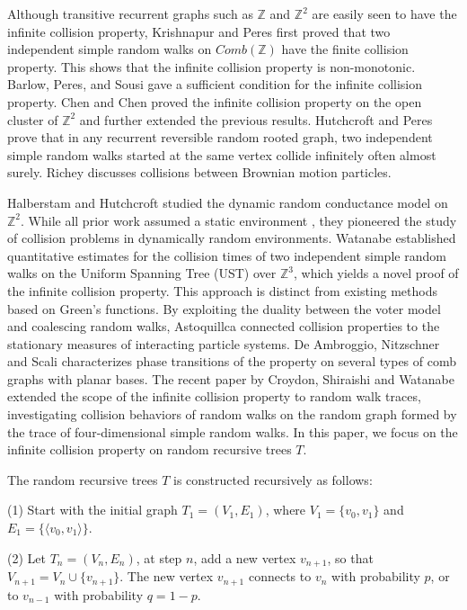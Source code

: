 \documentclass[10pt,twoside]{article}
\begin{document}
Although transitive recurrent graphs such as $\mathbb{Z}$ and $\mathbb{Z}^2$ are easily seen to have the infinite collision property, Krishnapur and Peres\cite{KP2004} first proved that two independent simple random walks on $Comb(\mathbb{Z})$ have the finite collision property. This shows that the infinite collision property is non-monotonic. Barlow, Peres, and Sousi\cite{BPS2010} gave a sufficient condition for the infinite collision property. Chen and Chen\cite{CC2010} proved the infinite collision property on the open cluster of $\mathbb{Z}^2$ and\cite{CC2011} further extended the previous results. Hutchcroft and Peres\cite{HP2015} prove that in any recurrent reversible random rooted graph, two independent simple random walks started at the same vertex collide infinitely often almost surely. Richey\cite{R2018} discusses collisions between Brownian motion particles.

Halberstam and Hutchcroft\cite{HH2022} studied the dynamic random conductance model on $\mathbb{Z}^2$. While all prior work assumed a static environment , they pioneered the study of collision problems in dynamically random environments. Watanabe\cite{W2023} established quantitative estimates for the collision times of two independent simple random walks on the Uniform Spanning Tree (UST) over $\mathbb{Z}^3$, which yields a novel proof of the infinite collision property. This approach is distinct from existing methods based on Green’s functions. By exploiting the duality between the voter model and coalescing random walks, Astoquillca\cite{A2024} connected collision properties to the stationary measures of interacting particle systems. De Ambroggio, Nitzschner and Scali\cite{DNS2025} characterizes phase transitions of the property on several types of comb graphs with planar bases. The recent paper by Croydon, Shiraishi and Watanabe\cite{CSW2026} extended the scope of the infinite collision property to random walk traces, investigating collision behaviors of random walks on the random graph formed by the trace of four-dimensional simple random walks. In this paper, we focus on the infinite collision property on random recursive trees $T$.

The random recursive trees $T$ is constructed recursively as follows:

(1) Start with the initial graph $T_1=(V_1, E_1)$, where $V_1 = \{v_0, v_1\}$ and $E_1 = \{\langle v_0, v_1 \rangle\}$.

(2) Let $T_{n}=(V_{n},E_{n})$, at step $ n$, add a new vertex $ v_{n+1} $, so that $ V_{n+1} = V_n \cup \{v_{n+1}\} $. The new vertex $ v_{n+1}$ connects to $ v_n $ with probability $ p $, or to $ v_{n-1} $ with probability $ q = 1-p$.
\end{document}
